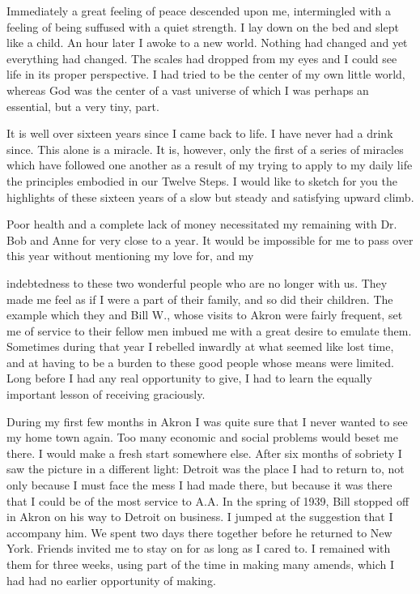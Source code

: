 Immediately a great feeling of peace descended upon me, intermingled with a feeling of being suffused with a quiet strength. I lay down on the bed and slept like a child. An hour later I awoke to a new world. Nothing had changed and yet everything had changed. The scales had dropped from my eyes and I could see life in its proper perspective. I had tried to be the center of my own little world, whereas God was the center of a vast universe of which I was perhaps an essential, but a very tiny, part.

It is well over sixteen years since I came back to life. I have never had a drink since. This alone is a miracle. It is, however, only the first of a series of miracles which have followed one another as a result of my trying to apply to my daily life the principles embodied in our Twelve Steps. I would like to sketch for you the highlights of these sixteen years of a slow but steady and satisfying upward climb.

Poor health and a complete lack of money necessitated my remaining with Dr. Bob and Anne for very close to a year. It would be impossible for me to pass over this year without mentioning my love for, and my

indebtedness to these two wonderful people who are no longer with us. They made me feel as if I were a part of their family, and so did their children. The example which they and Bill W., whose visits to Akron were fairly frequent, set me of service to their fellow men imbued me with a great desire to emulate them. Sometimes during that year I rebelled inwardly at what seemed like lost time, and at having to be a burden to these good people whose means were limited. Long before I had any real opportunity to give, I had to learn the equally important lesson of receiving graciously.

During my first few months in Akron I was quite sure that I never wanted to see my home town again. Too many economic and social problems would beset me there. I would make a fresh start somewhere else. After six months of sobriety I saw the picture in a different light: Detroit was the place I had to return to, not only because I must face the mess I had made there, but because it was there that I could be of the most service to A.A. In the spring of 1939, Bill stopped off in Akron on his way to Detroit on business. I jumped at the suggestion that I accompany him. We spent two days there together before he returned to New York. Friends invited me to stay on for as long as I cared to. I remained with them for three weeks, using part of the time in making many amends, which I had had no earlier opportunity of making.

